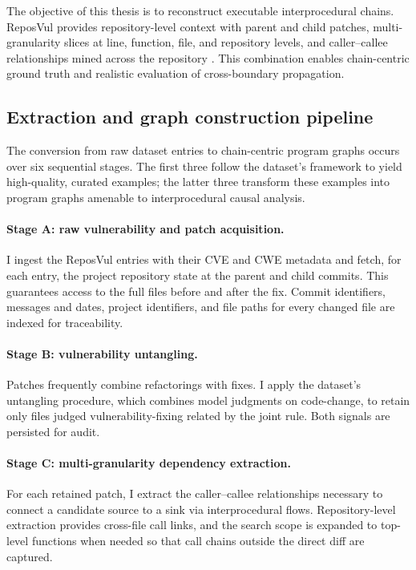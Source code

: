 \documentclass{buthesis}
\begin{document}
The objective of this thesis is to reconstruct executable interprocedural chains. ReposVul provides repository-level context with parent and child patches, multi-granularity slices at line, function, file, and repository levels, and caller–callee relationships mined across the repository \cite{wang2024reposvul}. This combination enables chain-centric ground truth and realistic evaluation of cross-boundary propagation.

\subsection{Extraction and graph construction pipeline}
\label{subsec:graph-construction}

The conversion from raw dataset entries to chain-centric program graphs occurs over six sequential stages. The first three follow the dataset’s framework to yield high-quality, curated examples; the latter three transform these examples into program graphs amenable to interprocedural causal analysis.

\paragraph{Stage A: raw vulnerability and patch acquisition.}
I ingest the ReposVul entries with their CVE and CWE metadata and fetch, for each entry, the project repository state at the parent and child commits. This guarantees access to the full files before and after the fix. Commit identifiers, messages and dates, project identifiers, and file paths for every changed file are indexed for traceability.

\paragraph{Stage B: vulnerability untangling.}
Patches frequently combine refactorings with fixes. I apply the dataset’s untangling procedure, which combines model judgments on code-change, to retain only files judged vulnerability-fixing related by the joint rule. Both signals are persisted for audit.

\paragraph{Stage C: multi-granularity dependency extraction.}
For each retained patch, I extract the caller–callee relationships necessary to connect a candidate source to a sink via interprocedural flows. Repository-level extraction provides cross-file call links, and the search scope is expanded to top-level functions when needed so that call chains outside the direct diff are captured.
\end{document}
